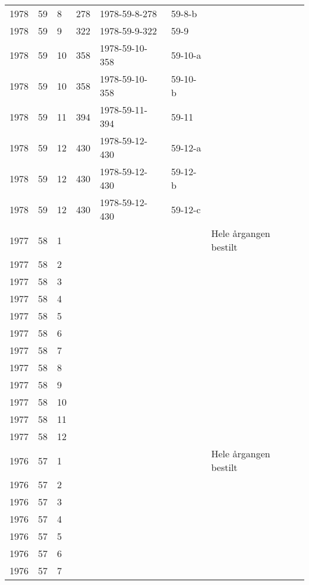 \begin{longtable}{ |l|l|l|l|p{2.7cm}|l|p{2cm}| }
 1978 & 59 &     8 &     278 & 1978-59-8-278  & 59-8-b & \\
 1978 & 59 &     9 &     322 & 1978-59-9-322  & 59-9  & \\
 1978 & 59 &    10 &     358 & 1978-59-10-358 & 59-10-a & \\
 1978 & 59 &    10 &     358 & 1978-59-10-358 & 59-10-b & \\
 1978 & 59 &    11 &     394 & 1978-59-11-394 & 59-11 & \\
 1978 & 59 &    12 &     430 & 1978-59-12-430 & 59-12-a & \\
 1978 & 59 &    12 &     430 & 1978-59-12-430 & 59-12-b & \\
 1978 & 59 &    12 &     430 & 1978-59-12-430 & 59-12-c & \\
 1977 & 58 &     1 &         &                &  & Hele årgangen bestilt \\
 1977 & 58 &     2 &         &                &  & \\
 1977 & 58 &     3 &         &                &  & \\
 1977 & 58 &     4 &         &                &  & \\
 1977 & 58 &     5 &         &                &  & \\
 1977 & 58 &     6 &         &                &  & \\
 1977 & 58 &     7 &         &                &  & \\
 1977 & 58 &     8 &         &                &  & \\
 1977 & 58 &     9 &         &                &  & \\
 1977 & 58 &    10 &         &                &  & \\
 1977 & 58 &    11 &         &                &  & \\
 1977 & 58 &    12 &         &                &  & \\
 1976 & 57 &     1 &         &                &  & Hele årgangen bestilt\\
 1976 & 57 &     2 &         &                &  & \\
 1976 & 57 &     3 &         &                &  & \\
 1976 & 57 &     4 &         &                &  & \\
 1976 & 57 &     5 &         &                &  & \\
 1976 & 57 &     6 &         &                &  & \\
 1976 & 57 &     7 &         &                &  & \\

\end{longtable}
